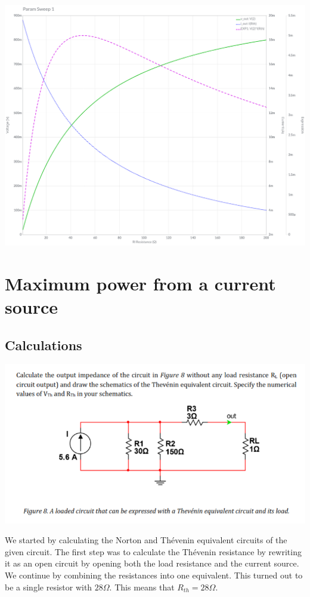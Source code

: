 \documentclass[11pt]{article}
\begin{document}
\includegraphics[width=\linewidth]{circuits/Lab 1 Task 5-Grapher.png}

\section{\bf{Maximum power from a current source}}

\subsection[25pt]{\bf{Calculations}}

\includegraphics[width=\linewidth]{6.1 calculations.png}

\noindent
We started by calculating the Norton and Thévenin equivalent circuits of the given circuit. 
The first step was to calculate the Thévenin resistance by rewriting it as an open circuit by opening both the load resistance and the current source.
We continue by combining the resistances into one equivalent. This turned out to be a single resistor with $28\Omega$.
This means that $R_{th} = 28\Omega$.
\end{document}

